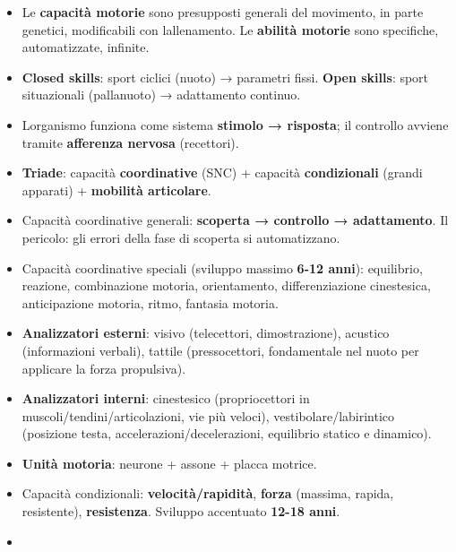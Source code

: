 \documentclass[a4paper,11pt]{article}
\providecommand{\tightlist}{%
  \setlength{\itemsep}{0pt}\setlength{\parskip}{0pt}}
\begin{document}
\begin{itemize}
      \tightlist
      \item
            Le \textbf{capacità motorie} sono presupposti generali del movimento,
            in parte genetici, modificabili con l\textquotesingle allenamento. Le
            \textbf{abilità motorie} sono specifiche, automatizzate, infinite.
      \item
            \textbf{Closed skills}: sport ciclici (nuoto) → parametri fissi.
            \textbf{Open skills}: sport situazionali (pallanuoto) → adattamento
            continuo.
      \item
            L\textquotesingle organismo funziona come sistema \textbf{stimolo →
                  risposta}; il controllo avviene tramite \textbf{afferenza nervosa}
            (recettori).
      \item
            \textbf{Triade}: capacità \textbf{coordinative} (SNC) + capacità
            \textbf{condizionali} (grandi apparati) + \textbf{mobilità
                  articolare}.
      \item
            Capacità coordinative generali: \textbf{scoperta → controllo →
                  adattamento}. Il pericolo: gli errori della fase di scoperta si
            automatizzano.
      \item
            Capacità coordinative speciali (sviluppo massimo \textbf{6-12 anni}):
            equilibrio, reazione, combinazione motoria, orientamento,
            differenziazione cinestesica, anticipazione motoria, ritmo, fantasia
            motoria.
      \item
            \textbf{Analizzatori esterni}: visivo (telecettori, dimostrazione),
            acustico (informazioni verbali), tattile (pressocettori, fondamentale
            nel nuoto per applicare la forza propulsiva).
      \item
            \textbf{Analizzatori interni}: cinestesico (propriocettori in
            muscoli/tendini/articolazioni, vie più veloci),
            vestibolare/labirintico (posizione testa, accelerazioni/decelerazioni,
            equilibrio statico e dinamico).
      \item
            \textbf{Unità motoria}: neurone + assone + placca motrice.
      \item
            Capacità condizionali: \textbf{velocità/rapidità}, \textbf{forza}
            (massima, rapida, resistente), \textbf{resistenza}. Sviluppo
            accentuato \textbf{12-18 anni}.
      \item

\end{itemize}
\end{document}
